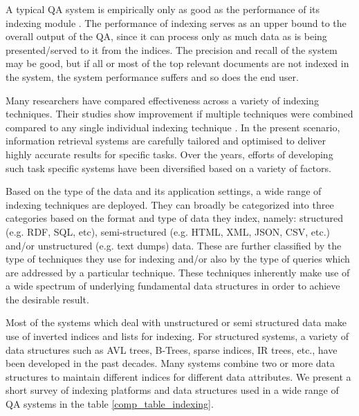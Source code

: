 \documentclass{article}
\begin{document}
A typical QA system is empirically only as good as the performance of its indexing module \cite{dong2007indexing}. The performance of indexing serves as an upper bound to the overall output of the QA, since it can process only as much data as is being presented/served to it from the indices. The precision and recall of the system may be good, but if all or most of the top relevant documents are not indexed in the system, the system performance suffers and so does the end user.

Many researchers have compared effectiveness across a variety of indexing techniques. Their studies show improvement if multiple techniques were combined compared to any single individual indexing technique \cite{rajashekar1995combining}. In the present scenario, information retrieval systems are carefully tailored and optimised to deliver highly accurate results for specific tasks. Over the years, efforts of developing such task specific systems have been diversified based on a variety of factors. 

Based on the type of the data and its application settings, a wide range of indexing techniques are deployed. They can broadly be categorized into three categories based on the format and type of data they index, namely: structured (e.g. RDF, SQL, etc), semi-structured (e.g. HTML, XML, JSON, CSV, etc.) and/or unstructured (e.g. text dumps) data. These are further classified by the type of techniques they use for indexing and/or also by the type of queries which are addressed by a particular technique. These techniques inherently make use of a wide spectrum of underlying fundamental data structures in order to achieve the desirable result.


Most of the systems which deal with unstructured or semi structured data make use of inverted indices and lists for indexing. For structured systems, a variety of data structures such as AVL trees, B-Trees, sparse indices, IR trees, etc., have been developed in the past decades. Many systems combine two or more data structures to maintain different indices for different data attributes. We present a short survey of indexing platforms and data structures used in a wide range of QA systems in the table \ref{comp_table_indexing}. 
\end{document}
